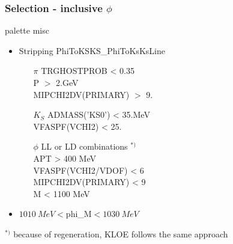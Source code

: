 \documentclass{beamer}
\begin{document}
\LogoOff
\begin{frame}[fragile]
\frametitle{Selection - inclusive $\phi$}

\begin{beamercolorbox}[rounded=true,shadow=true]{palette misc}
\begin{itemize}
\item Stripping PhiToKSKS\_PhiToKsKsLine
\begin{itemize}
\item[$\pi$] 
TRGHOSTPROB < 0.35\\
P $>$ 2.GeV\\
MIPCHI2DV(PRIMARY) $>$ 9.\\
\item[$K_S$]ADMASS('KS0') < 35.MeV\\
VFASPF(VCHI2) < 25.\\
\item[$\phi$]LL or LD combinations $^{*)}$\\
APT > 400 MeV\\
VFASPF(VCHI2/VDOF) < 6\\
MIPCHI2DV(PRIMARY) < 9\\
M < 1100 MeV\\
\end{itemize}
\item $\SI{1010}{MeV}<$phi\_M$<\SI{1030}{MeV}$
\end{itemize}
\end{beamercolorbox}
$^{*)}$ because of regeneration, KLOE follows the same approach



\end{frame}
\LogoOn
\end{document}
